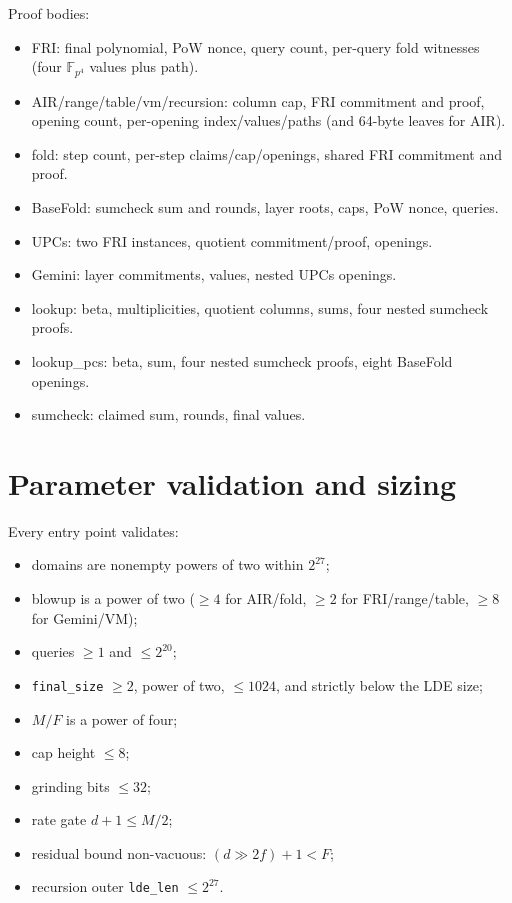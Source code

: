 \documentclass[11pt,a4paper]{article}
\newcommand{\yFpFour}{\mathbb{F}_{p^4}}
\begin{document}
Proof bodies:
\begin{itemize}[leftmargin=1.3em]
\item FRI: final polynomial, PoW nonce, query count, per-query fold witnesses
(four $\yFpFour$ values plus path).
\item AIR/range/table/vm/recursion: column cap, FRI commitment and proof,
opening count, per-opening index/values/paths (and 64-byte leaves for AIR).
\item fold: step count, per-step claims/cap/openings, shared FRI commitment
and proof.
\item BaseFold: sumcheck sum and rounds, layer roots, caps, PoW nonce, queries.
\item UPCs: two FRI instances, quotient commitment/proof, openings.
\item Gemini: layer commitments, values, nested UPCs openings.
\item lookup: beta, multiplicities, quotient columns, sums, four nested
sumcheck proofs.
\item lookup\_pcs: beta, sum, four nested sumcheck proofs, eight BaseFold
openings.
\item sumcheck: claimed sum, rounds, final values.
\end{itemize}

\section{Parameter validation and sizing}

Every entry point validates:
\begin{itemize}[leftmargin=1.3em]
\item domains are nonempty powers of two within $2^{27}$;
\item blowup is a power of two ($\ge4$ for AIR/fold, $\ge2$ for
FRI/range/table, $\ge8$ for Gemini/VM);
\item queries $\ge1$ and $\le2^{20}$;
\item \texttt{final\_size} $\ge2$, power of two, $\le1024$, and strictly
below the LDE size;
\item $M/F$ is a power of four;
\item cap height $\le8$;
\item grinding bits $\le32$;
\item rate gate $d+1\le M/2$;
\item residual bound non-vacuous: $(d\gg2f)+1<F$;
\item recursion outer \texttt{lde\_len} $\le2^{27}$.
\end{itemize}
\end{document}
